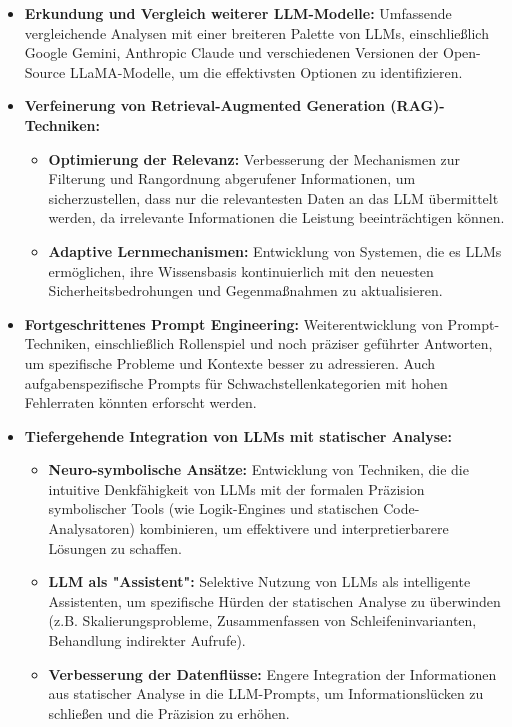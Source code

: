 \begin{itemize}
    \item \textbf{Erkundung und Vergleich weiterer LLM-Modelle:} Umfassende vergleichende Analysen mit einer breiteren Palette von LLMs, einschließlich Google Gemini, Anthropic Claude und verschiedenen Versionen der Open-Source LLaMA-Modelle, um die effektivsten Optionen zu identifizieren.
    \item \textbf{Verfeinerung von Retrieval-Augmented Generation (RAG)-Techniken:}
    \begin{itemize}
        \item \textbf{Optimierung der Relevanz:} Verbesserung der Mechanismen zur Filterung und Rangordnung abgerufener Informationen, um sicherzustellen, dass nur die relevantesten Daten an das LLM übermittelt werden, da irrelevante Informationen die Leistung beeinträchtigen können.
        \item \textbf{Adaptive Lernmechanismen:} Entwicklung von Systemen, die es LLMs ermöglichen, ihre Wissensbasis kontinuierlich mit den neuesten Sicherheitsbedrohungen und Gegenmaßnahmen zu aktualisieren.
    \end{itemize}
    \item \textbf{Fortgeschrittenes Prompt Engineering:} Weiterentwicklung von Prompt-Techniken, einschließlich Rollenspiel und noch präziser geführter Antworten, um spezifische Probleme und Kontexte besser zu adressieren. Auch aufgabenspezifische Prompts für Schwachstellenkategorien mit hohen Fehlerraten könnten erforscht werden.
    \item \textbf{Tiefergehende Integration von LLMs mit statischer Analyse:}
    \begin{itemize}
        \item \textbf{Neuro-symbolische Ansätze:} Entwicklung von Techniken, die die intuitive Denkfähigkeit von LLMs mit der formalen Präzision symbolischer Tools (wie Logik-Engines und statischen Code-Analysatoren) kombinieren, um effektivere und interpretierbarere Lösungen zu schaffen.
        \item \textbf{LLM als "Assistent":} Selektive Nutzung von LLMs als intelligente Assistenten, um spezifische Hürden der statischen Analyse zu überwinden (z.B. Skalierungsprobleme, Zusammenfassen von Schleifeninvarianten, Behandlung indirekter Aufrufe).
        \item \textbf{Verbesserung der Datenflüsse:} Engere Integration der Informationen aus statischer Analyse in die LLM-Prompts, um Informationslücken zu schließen und die Präzision zu erhöhen.

\end{itemize}
\end{itemize}
